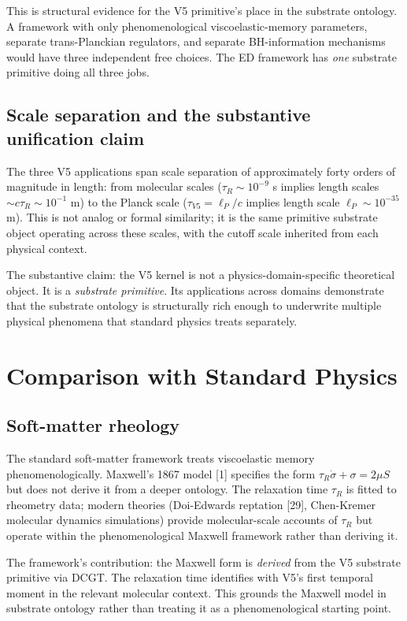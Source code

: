 \documentclass[11pt,a4paper]{article}
\begin{document}
This is structural evidence for the V5 primitive's place in the substrate ontology. A framework with only phenomenological viscoelastic-memory parameters, separate trans-Planckian regulators, and separate BH-information mechanisms would have three independent free choices. The ED framework has \emph{one} substrate primitive doing all three jobs.

\subsection{Scale separation and the substantive unification claim}

The three V5 applications span scale separation of approximately forty orders of magnitude in length: from molecular scales ($\tau_R \sim 10^{-9}$ s implies length scales $\sim c\tau_R \sim 10^{-1}$ m) to the Planck scale ($\tau_{V5} = \ell_P/c$ implies length scale $\ell_P \sim 10^{-35}$ m). This is not analog or formal similarity; it is the same primitive substrate object operating across these scales, with the cutoff scale inherited from each physical context.

The substantive claim: the V5 kernel is not a physics-domain-specific theoretical object. It is a \emph{substrate primitive}. Its applications across domains demonstrate that the substrate ontology is structurally rich enough to underwrite multiple physical phenomena that standard physics treats separately.

\section{Comparison with Standard Physics}

\subsection{Soft-matter rheology}

The standard soft-matter framework treats viscoelastic memory phenomenologically. Maxwell's 1867 model [1] specifies the form $\tau_R \dot\sigma + \sigma = 2\mu S$ but does not derive it from a deeper ontology. The relaxation time $\tau_R$ is fitted to rheometry data; modern theories (Doi-Edwards reptation [29], Chen-Kremer molecular dynamics simulations) provide molecular-scale accounts of $\tau_R$ but operate within the phenomenological Maxwell framework rather than deriving it.

The framework's contribution: the Maxwell form is \emph{derived} from the V5 substrate primitive via DCGT. The relaxation time identifies with V5's first temporal moment in the relevant molecular context. This grounds the Maxwell model in substrate ontology rather than treating it as a phenomenological starting point.
\end{document}
